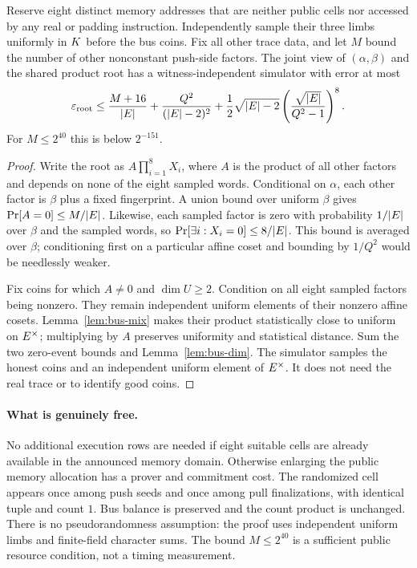 \begin{theorem}\label{thm:bus-root}
Reserve eight distinct memory addresses that are neither public cells nor accessed by any real or padding instruction. Independently sample their three limbs uniformly in $K$ before the bus coins. Fix all other trace data, and let $M$ bound the number of other nonconstant push-side factors. The joint view of $(\alpha,\beta)$ and the shared product root has a witness-independent simulator with error at most
\[
 \varepsilon_{\mathrm{root}}\le
 \frac{M+16}{|E|}+\frac{Q^2}{(|E|-2)^2}
 +\frac12\sqrt{|E|-2}
       \left(\frac{\sqrt{|E|}}{Q^2-1}\right)^8.
\]
For $M\le2^{40}$ this is below $2^{-151}$.
\end{theorem}
\begin{proof}
Write the root as $A\prod_{i=1}^8X_i$, where $A$ is the product of all other factors and depends on none of the eight sampled words. Conditional on $\alpha$, each other factor is $\beta$ plus a fixed fingerprint. A union bound over uniform $\beta$ gives $\Pr[A=0]\le M/|E|$. Likewise, each sampled factor is zero with probability $1/|E|$ over $\beta$ and the sampled words, so $\Pr[\exists i:X_i=0]\le8/|E|$. This bound is averaged over $\beta$; conditioning first on a particular affine coset and bounding by $1/Q^2$ would be needlessly weaker.

Fix coins for which $A\ne0$ and $\dim U\ge2$. Condition on all eight sampled factors being nonzero. They remain independent uniform elements of their nonzero affine cosets. Lemma~\ref{lem:bus-mix} makes their product statistically close to uniform on $E^\times$; multiplying by $A$ preserves uniformity and statistical distance. Sum the two zero-event bounds and Lemma~\ref{lem:bus-dim}. The simulator samples the honest coins and an independent uniform element of $E^\times$. It does not need the real trace or to identify good coins.
\end{proof}

\paragraph{What is genuinely free.} No additional execution rows are needed if eight suitable cells are already available in the announced memory domain. Otherwise enlarging the public memory allocation has a prover and commitment cost. The randomized cell appears once among push seeds and once among pull finalizations, with identical tuple and count $1$. Bus balance is preserved and the count product is unchanged. There is no pseudorandomness assumption: the proof uses independent uniform limbs and finite-field character sums. The bound $M\le2^{40}$ is a sufficient public resource condition, not a timing measurement.

